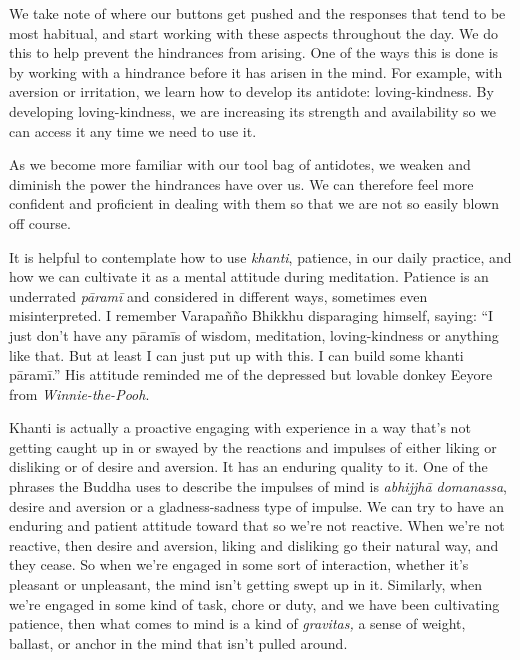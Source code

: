 We take note of where our buttons get pushed and the responses that 
tend to be most habitual, and start working with these aspects 
throughout the day. We do this to help prevent the hindrances from 
arising. One of the ways this is done is by working with a hindrance 
before it has arisen in the mind. For example, with aversion or 
irritation, we learn how to develop its antidote: loving-kindness. By 
developing loving-kindness, we are increasing its strength and 
availability so we can access it any time we need to use it.

As we become more familiar with our tool bag of antidotes, we weaken 
and diminish the power the hindrances have over us. We can therefore 
feel more confident and proficient in dealing with them so that we are 
not so easily blown off course.


It is helpful to contemplate how to use \emph{khanti}, patience, in our 
daily practice, and how we can cultivate it as a mental attitude during 
meditation. Patience is an underrated \emph{pāramī} and considered in 
different ways, sometimes even misinterpreted. I remember Varapañño 
Bhikkhu disparaging himself, saying: ``I just don't have any pāramīs 
of wisdom, meditation, loving-kindness or anything like that. But at 
least I can just put up with this. I can build some khanti pāramī.'' 
His attitude reminded me of the depressed but lovable donkey Eeyore 
from \emph{Winnie-the-Pooh}.

Khanti is actually a proactive engaging with experience in a way that's 
not getting caught up in or swayed by the reactions and impulses of 
either liking or disliking or of desire and aversion. It has an 
enduring quality to it. One of the phrases the Buddha uses to describe 
the impulses of mind is \emph{abhijjhā domanassa}, desire and aversion 
or a gladness-sadness type of impulse. We can try to have an enduring 
and patient attitude toward that so we're not reactive. When we're not 
reactive, then desire and aversion, liking and disliking go their 
natural way, and they cease. So when we're engaged in some sort of 
interaction, whether it's pleasant or unpleasant, the mind isn't 
getting swept up in it. Similarly, when we're engaged in some kind of 
task, chore or duty, and we have been cultivating patience, then what 
comes to mind is a kind of \emph{gravitas,} a sense of weight, ballast, 
or anchor in the mind that isn't pulled around.

